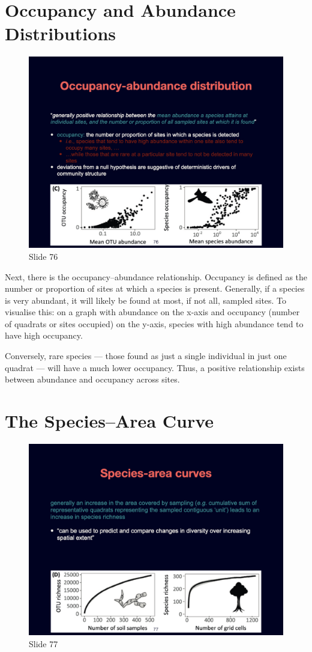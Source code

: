 \documentclass[
  10pt,
]{book}
\begin{document}
\section{Occupancy and Abundance
Distributions}\label{occupancy-and-abundance-distributions}

\begin{figure}[ht]
\centering
\includegraphics[width=0.8\linewidth]{../images/BDC334/BDC334-076.jpeg}
\caption*{Slide 76}
\end{figure}

Next, there is the occupancy--abundance relationship. Occupancy is
defined as the number or proportion of sites at which a species is
present. Generally, if a species is very abundant, it will likely be
found at most, if not all, sampled sites. To visualise this: on a graph
with abundance on the x-axis and occupancy (number of quadrats or sites
occupied) on the y-axis, species with high abundance tend to have high
occupancy.

Conversely, rare species --- those found as just a single individual in
just one quadrat --- will have a much lower occupancy. Thus, a positive
relationship exists between abundance and occupancy across sites.

\section{The Species--Area Curve}\label{the-speciesarea-curve}

\begin{figure}[ht]
\centering
\includegraphics[width=0.8\linewidth]{../images/BDC334/BDC334-077.jpeg}
\caption*{Slide 77}
\end{figure}
\end{document}

